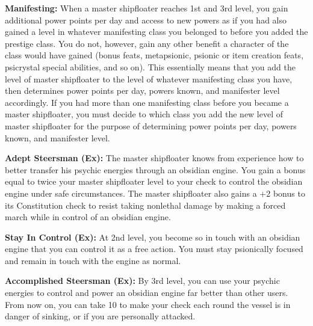 {
\textbf{Manifesting:} When a master shipfloater reaches 1st and 3rd level, you gain additional power points per day and access to new powers as if you had also gained a level in whatever manifesting class you belonged to before you added the prestige class. You do not, however, gain any other benefit a character of the class would have gained (bonus feats, metapsionic, psionic or item creation feats, psicrystal special abilities, and so on). This essentially means that you add the level of master shipfloater to the level of whatever manifesting class you have, then determines power points per day, powers known, and manifester level accordingly. If you had more than one manifesting class before you became a master shipfloater, you must decide to which class you add the new level of master shipfloater for the purpose of determining power points per day, powers known, and manifester level.

\textbf{Adept Steersman (Ex):} The master shipfloater knows from experience how to better transfer his psychic energies through an obsidian engine. You gain a bonus equal to twice your master shipfloater level to your  check to control the obsidian engine under safe circumstances. The master shipfloater also gains a +2 bonus to its Constitution check to resist taking nonlethal damage by making a forced march while in control of an obsidian engine.

\textbf{Stay In Control (Ex):} At 2nd level, you become so in touch with an obsidian engine that you can control it as a free action. You must stay psionically focused and remain in touch with the engine as normal.

\textbf{Accomplished Steersman (Ex):} By 3rd level, you can use your psychic energies to control and power an obsidian engine far better than other users. From now on, you can take 10 to make your  check each round the vessel is in danger of sinking, or if you are personally attacked.
}